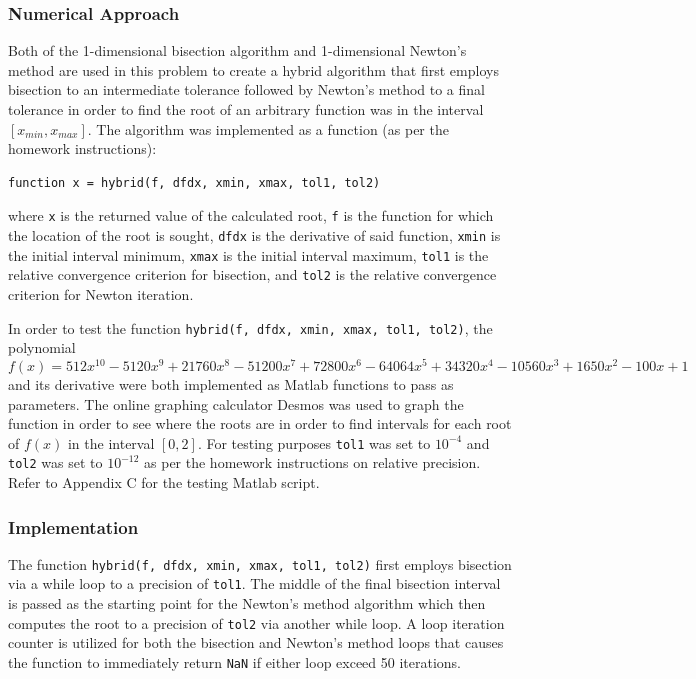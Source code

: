 \documentclass[10pt]{article}
\def\code#1{\texttt{#1}}
\begin{document}
\subsubsection*{Numerical Approach}

Both of the 1-dimensional bisection algorithm and 1-dimensional Newton's method are used in this problem to 
create a hybrid algorithm that first employs bisection to an intermediate tolerance followed by Newton's method to
a final tolerance in order to find the root of an arbitrary function was in the interval $[x_{min}, x_{max}]$.
The algorithm was implemented as a function (as per the homework instructions):
\begin{verbatim}
function x = hybrid(f, dfdx, xmin, xmax, tol1, tol2)
\end{verbatim}
where \code{x} is the returned value of the calculated root, \code{f} is the function for which the location
of the root is sought, \code{dfdx} is the derivative of said function, \code{xmin} is the initial interval 
minimum, \code{xmax} is the initial interval maximum, \code{tol1} is the relative convergence criterion for
bisection, and \code{tol2} is the relative convergence criterion for Newton iteration.

In order to test the function \code{hybrid(f, dfdx, xmin, xmax, tol1, tol2)}, the polynomial 
$$f(x) = 512x^{10}-5120x^9 + 21760x^8-51200x^7 + 72800x^6-64064x^5 + 34320x^4-10560x^3 + 1650x^2-100x + 1$$
and its derivative were both implemented as Matlab functions to pass as parameters. The online graphing 
calculator Desmos was used to graph the function in order to see where the roots are in order to find intervals
for each root of $f(x)$ in the interval $[0,2]$. For testing purposes \code{tol1} was set to $10^{-4}$ and 
\code{tol2} was set to $10^{-12}$ as per the homework instructions on relative precision. Refer to Appendix C 
for the testing Matlab script. 

\subsubsection*{Implementation}

The function \code{hybrid(f, dfdx, xmin, xmax, tol1, tol2)} first employs bisection via a while loop to a 
precision of \code{tol1}. The middle of the final bisection interval is passed as the starting point for the 
Newton's method algorithm which then computes the root to a precision of \code{tol2} via another while loop. 
A loop iteration counter is utilized for both the bisection and Newton's method loops that causes the function
to immediately return \code{NaN} if either loop exceed 50 iterations.
\end{document}
